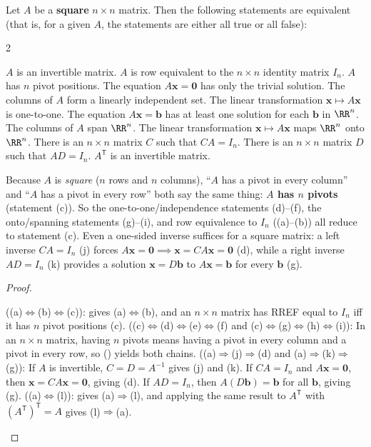 \documentclass[10pt]{scrartcl}
\newcommand{\vv}[1]{\mathbf{#1}}
\begin{document}
\begin{theorem*}
  Let $A$ be a \textbf{square} $n\times n$ matrix. Then the following statements are equivalent (that is, for a given $A$, the statements are either all true or all false):
  \begin{multicols}{2}
  \begin{enumerate}[(a)]
    \ii $A$ is an invertible matrix.
    \ii $A$ is row equivalent to the $n\times n$ identity matrix $I_n$.
    \ii $A$ has $n$ pivot positions.
    \ii The equation $A\vv x=\vv 0$ has only the trivial solution.
    \ii The columns of $A$ form a linearly independent set.
    \ii The linear transformation $\vv x\mapsto A\vv x$ is one-to-one.
    \ii The equation $A\vv x=\vv b$ has at least one solution for each $\vv b$ in $\RR^n$.
    \ii The columns of $A$ span $\RR^n$.
    \ii The linear transformation $\vv x\mapsto A\vv x$ maps $\RR^n$ onto $\RR^n$.
    \ii There is an $n\times n$ matrix $C$ such that $CA=I_n$.
    \ii There is an $n\times n$ matrix $D$ such that $AD=I_n$.
    \ii $A^{\mathsf T}$ is an invertible matrix.
  \end{enumerate}
  \end{multicols}
\end{theorem*}
\begin{ideabox}
  Because $A$ is \emph{square} ($n$ rows and $n$ columns), ``$A$ has a pivot in every column'' and ``$A$ has a pivot in every row'' both say the same thing: \textbf{$A$ has $n$ pivots} (statement (c)). So the one-to-one/independence statements (d)--(f), the onto/spanning statements (g)--(i), and row equivalence to $I_n$ ((a)--(b)) all reduce to statement (c). Even a one-sided inverse suffices for a square matrix: a left inverse $CA=I_n$ (j) forces $A\vv x=\vv 0\implies\vv x=CA\vv x=\vv 0$ (d), while a right inverse $AD=I_n$ (k) provides a solution $\vv x=D\vv b$ to $A\vv x=\vv b$ for every $\vv b$ (g).
\end{ideabox}
\begin{proof}
  \begin{steps}
    \ii ((a)$\iff$(b)$\iff$(c)):  gives (a)$\iff$(b), and an $n\times n$ matrix has RREF equal to $I_n$ iff it has $n$ pivot positions (c).
    \ii ((c)$\iff$(d)$\iff$(e)$\iff$(f) and (c)$\iff$(g)$\iff$(h)$\iff$(i)): In an $n\times n$ matrix, having $n$ pivots means having a pivot in every column and a pivot in every row, so () yields both chains.
    \ii ((a)$\Rightarrow$(j)$\Rightarrow$(d) and (a)$\Rightarrow$(k)$\Rightarrow$(g)): If $A$ is invertible, $C=D=A^{-1}$ gives (j) and (k). If $CA=I_n$ and $A\vv x=\vv 0$, then $\vv x=CA\vv x=\vv 0$, giving (d). If $AD=I_n$, then $A(D\vv b)=\vv b$ for all $\vv b$, giving (g).
    \ii ((a)$\iff$(l)):  gives (a)$\Rightarrow$(l), and applying the same result to $A^{\mathsf T}$ with $(A^{\mathsf T})^{\mathsf T}=A$ gives (l)$\Rightarrow$(a).
  \end{steps}
\end{proof}
\end{document}
